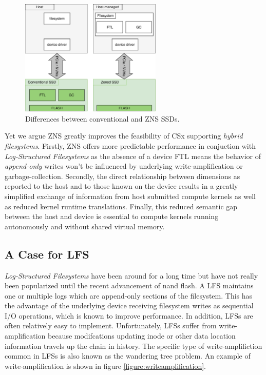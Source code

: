 \begin{figure}
    \centering
	\includegraphics[width=0.6\textwidth]{resources/images/zns-vs-conventional.pdf}
	\caption{Differences between conventional and ZNS SSDs.}
    \label{figure:znsvsconventional}
\end{figure}

Yet we argue ZNS greatly improves the feasibility of CSx supporting
\textit{hybrid filesystems}. Firstly, ZNS offers more predictable performance in
conjuction with \textit{Log-Structured Filesystems} as the absence of a device
FTL means the behavior of \textit{append-only} writes won't be influenced by
underlying write-amplification or garbage-collection. Secondly, the direct
relationship between dimensions as reported to the host and to those known on
the device results in a greatly simplified exchange of information from host
submitted compute kernels as well as reduced kernel runtime translations.
Finally, this reduced semantic gap between the host and device is essential to
compute kernels running autonomously and without shared virtual memory.

\subsection{A Case for LFS}

\textit{Log-Structured Filesystems} have been around for a long
time \cite{Rosenblum1992TheDA} but have not really been popularized until the
recent advancement of nand flash. A LFS maintains one or multiple logs which
are append-only sections of the filesystem. This has the advantage of the
underlying device receiving filesystem writes as sequential I/O operations,
which is known to improve performance. In addition, LFSs are often relatively
easy to implement. Unfortunately, LFSs suffer from write-amplification because
modifcations updating inode or other data location information travels up the
chain in history. The specific type of write-amplifiction common in LFSs is
also known as the wandering tree problem. An example of write-amplification is
shown in figure \ref{figure:writeamplification}.

